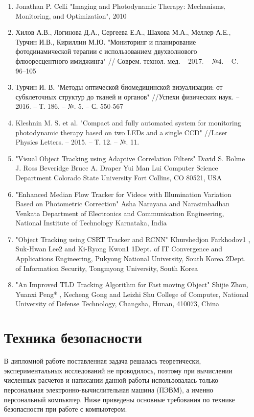 \documentclass[a4paper,14pt]{extarticle}
\begin{document}
\begin{enumerate}
    \item Jonathan P. Celli "Imaging and Photodynamic Therapy: Mechanisms, Monitoring, and Optimization", 2010

    \item Хилов А.В., Логинова Д.А., Сергеева Е.А., Шахова М.А., Меллер А.Е., Турчин И.В., Кириллин М.Ю. "Мониторинг и планирование фотодинамической терапии с использованием двухволнового флюоресцентного имиджинга" // Соврем. технол. мед. – 2017. –  №4. – C. 96–105
    \item Турчин И. В. "Методы оптической биомедицинской визуализации: от субклеточных структур до тканей и органов" //Успехи физических наук. – 2016. – Т. 186. – №. 5. – С. 550-567
    \item Kleshnin M. S. et al. "Compact and fully automated system for monitoring photodynamic therapy based on two LEDs and a single CCD" //Laser Physics Letters. – 2015. – Т. 12. – №. 11. 
    \item "Visual Object Tracking using Adaptive Correlation Filters"
            David S. Bolme J. Ross Beveridge Bruce A. Draper Yui Man Lui
Computer Science Department
Colorado State University
Fort Collins, CO 80521, USA
    \item "Enhanced Median Flow Tracker for Videos with 
Illumination Variation Based on Photometric 
Correction"
Asha Narayana and Narasimhadhan Venkata
Department of Electronics and Communication Engineering, National Institute of Technology Karnataka, India
    \item "Object Tracking using CSRT Tracker and RCNN" 
Khurshedjon Farkhodov1
, Suk-Hwan Lee2
 and Ki-Ryong Kwon1
1Dept. of IT Convergence and Applications Engineering, Pukyong National University, South Korea 2Dept. of Information Security, Tongmyong University, South Korea

    \item "An Improved TLD Tracking Algorithm for Fastmoving Object" 
Shijie Zhou, Yuanxi Peng*
, Kecheng Gong and Leizhi Shu 
College of Computer, National University of Defense Technology, Changsha, Hunan, 410073, China 
\end{enumerate}

\newpage

\section{Техника безопасности}
В дипломной работе поставленная задача решалась теоретически, экспериментальных исследований не проводилось, поэтому при вычислении численных расчетов и написании данной работы использовалась только персональная электронно-вычислительная машина (ПЭВМ), а именно персональный компьютер. Ниже приведены основные требования по технике безопасности при работе с компьютером.
\end{document}
